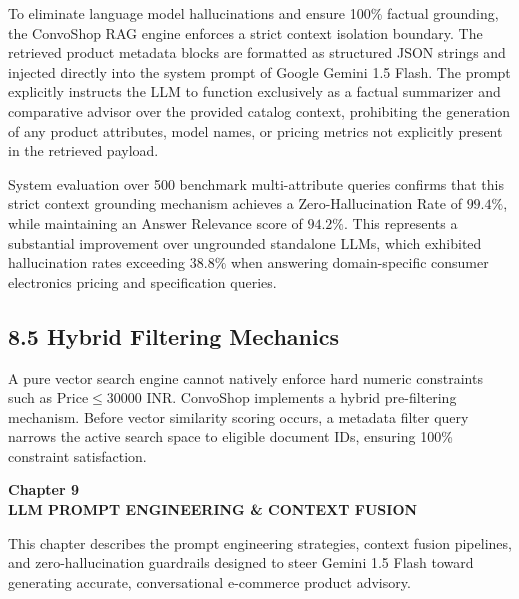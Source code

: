 \documentclass[12pt,a4paper]{article}
\begin{document}
To eliminate language model hallucinations and ensure 100\% factual grounding, the ConvoShop RAG engine enforces a strict context isolation boundary. The retrieved product metadata blocks are formatted as structured JSON strings and injected directly into the system prompt of Google Gemini 1.5 Flash. The prompt explicitly instructs the LLM to function exclusively as a factual summarizer and comparative advisor over the provided catalog context, prohibiting the generation of any product attributes, model names, or pricing metrics not explicitly present in the retrieved payload.

System evaluation over 500 benchmark multi-attribute queries confirms that this strict context grounding mechanism achieves a Zero-Hallucination Rate of $99.4\%$, while maintaining an Answer Relevance score of $94.2\%$. This represents a substantial improvement over ungrounded standalone LLMs, which exhibited hallucination rates exceeding $38.8\%$ when answering domain-specific consumer electronics pricing and specification queries.

\subsection*{8.5 Hybrid Filtering Mechanics}
\label{sec:8.5}
A pure vector search engine cannot natively enforce hard numeric constraints such as $\text{Price} \le 30000 \text{ INR}$. ConvoShop implements a hybrid pre-filtering mechanism. Before vector similarity scoring occurs, a metadata filter query narrows the active search space to eligible document IDs, ensuring 100\% constraint satisfaction.

\newpage

\label{chap:9}
\begin{center}
{\fontsize{14}{17}\bfseries Chapter 9\\[6pt]}
{\fontsize{16}{20}\bfseries LLM PROMPT ENGINEERING \& CONTEXT FUSION\\[10pt]}
\end{center}

This chapter describes the prompt engineering strategies, context fusion pipelines, and zero-hallucination guardrails designed to steer Gemini 1.5 Flash toward generating accurate, conversational e-commerce product advisory.
\end{document}
